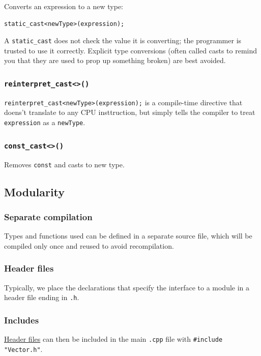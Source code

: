 \documentclass[table, xcdraw]{article}%
\begin{document}
Converts an expression to a new type:

\begin{verbatim}
static_cast<newType>(expression);
\end{verbatim}

A \texttt{static_cast} does not check the value it is converting; the programmer is trusted to use it correctly. Explicit type conversions (often called casts to remind you that they are used to prop up something broken) are best avoided.

\subsubsection{\texttt{reinterpret_cast<>()}}

\texttt{reinterpret_cast<newType>(expression);} is a compile-time directive that doens't translate to any CPU insttruction, but simply tells the compiler to treat \texttt{expression} as a \texttt{newType}.

\subsubsection{\texttt{const_cast<>()}}

Removes \texttt{const} and casts to new type.

\subsection{Modularity}

\subsubsection{Separate compilation}
Types and functions used can be defined in a separate source file, which will be compiled only once and reused to avoid recompilation.

\subsubsection{Header files} \label{headerfiles}
Typically, we place the declarations that specify the interface to a module in a header file ending in \texttt{.h}.

\subsubsection{Includes}
\hyperref[headerfiles]{Header files} can then be included in the main \texttt{.cpp} file with \texttt{#include "Vector.h"}.
\end{document}
